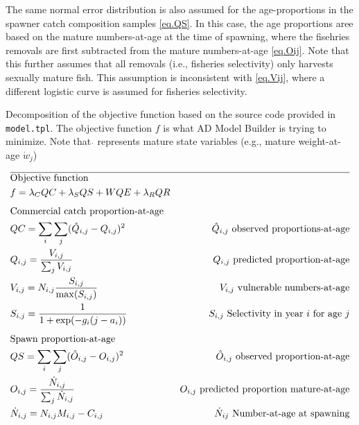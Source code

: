 \documentclass[12pt,letterpaper]{article}
\newcounter{saveEq}
\def\putEq{\setcounter{saveEq}{\value{equation}}}
\def\tableEq{ %
    \putEq \setcounter{equation}{0}
    \renewcommand{\theequation}{T\arabic{table}.\arabic{equation}}
    \vspace{-5mm}
    }
\begin{document}
    The same normal error distribution is also assumed for the age-proportions in the spawner catch composition samples \eqref{eq.QS}.  In this case, the age proportions aree based on the mature numbers-at-age at the time of spawning, where the fisehries removals are first subtracted from the mature numbers-at-age \eqref{eq.Oij}.  Note that this further assumes that all removals (i.e., fisheries selectivity) only harvests sexually mature fish.  This assumption is inconsistent with \eqref{eq.Vij}, where a different logistic curve is assumed for fisheries selectivity.  



    \begin{table}[ht]
      \centering
      \caption{Decomposition of the objective function based on the source code provided in \texttt{model.tpl}. The objective function $f$ is what AD Model Builder is trying to minimize. Note that $\dot{}$ represents mature state variables (e.g., mature weight-at-age $\dot{w}_j$)}
      \label{tab:ModelDeconstruction}
      \tableEq
      \begin{align}
        \hline \nonumber
        &\mbox{Objective function} & \nonumber\\
        & f = \lambda_C QC + \lambda_S QS + WQE + \lambda_R QR & \label{eq.f} \\[1ex]
        &\mbox{Commercial catch proportion-at-age}  \nonumber\\
        & QC = \sum_i \sum_j (\hat{Q}_{i,j} - Q_{i,j})^2 & \mbox{$\hat{Q}_{i,j}$ observed proportions-at-age} \label{eq.SSQC}\\
        & Q_{i,j} = \frac{V_{i,j}}{\sum_j V_{i,j}} & \mbox{$Q_{i,j}$ predicted proportion-at-age} \label{eq.Qij} \\
        & V_{i,j} = N_{i,j} \frac{S_{i,j}}{\max(S_{i,j})} & \mbox{$V_{i,j}$ vulnerable numbers-at-age} \label{eq.Vij}\\
        & S_{i,j} = \frac{1}{1+\exp(-g_i(j-a_i))} &\mbox{$S_{i,j}$ Selectivity in year $i$ for age $j$} \label{eq.Sij} \\[1ex]
        &\mbox{Spawn proportion-at-age} \nonumber\\
        & QS = \sum_i \sum_j (\hat{O}_{i,j}-O_{i,j})^2 &  \mbox{$\hat{O}_{i,j}$ observed proportion-at-age} \label{eq.QS}\\
        & O_{i,j} = \frac{\dot{N}_{i,j}}{\sum_j \dot{N}_{i,j} } & \mbox{$O_{i,j}$ predicted proportion mature-at-age} \label{eq.Oij}\\
        & \dot{N}_{i,j} = N_{i,j} M_{i,j} - C_{i,j} & \mbox{$\dot{N}_{ij}$  Number-at-age at spawning} \\

\end{align}
\end{table}
\end{document}
